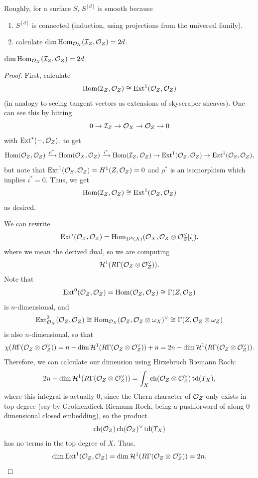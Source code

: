 \documentclass[12pt]{article}
\DeclareMathOperator{\chern}{ch}
\DeclareMathOperator{\todd}{td}
\begin{document}
Roughly, for a surface $S$, $S^{[d]}$ is smooth because
\begin{enumerate}
    \item $S^{[d]}$ is connected (induction, using projections from the universal family).
    \item calculate $\dim \mathrm{Hom}_{\mathcal{O}_X}(\mathcal{I}_Z,\mathcal{O}_Z) = 2d$. 
\end{enumerate}

\begin{prop}
    $\dim \mathrm{Hom}_{\mathcal{O}_X}(\mathcal{I}_Z,\mathcal{O}_Z) = 2d$.
\end{prop}
\begin{proof}
    First, calculate
    \[\mathrm{Hom}(\mathcal{I}_Z,\mathcal{O}_Z) \cong \mathrm{Ext}^1(\mathcal{O}_Z,\mathcal{O}_Z)\]
    (in analogy to seeing tangent vectors as extensions of skyscraper sheaves). One can see this by hitting
    \[0\to \mathcal{I}_Z \to \mathcal{O}_X \to \mathcal{O}_Z \to 0\]
    with $\mathrm{Ext}^*(-,\mathcal{O}_Z)$, to get
    \[\mathrm{Hom}(\mathcal{O}_Z,\mathcal{O}_Z) \xrightarrow{\rho^*} \mathrm{Hom}(\mathcal{O}_X,\mathcal{O}_Z) \xrightarrow{i^*} \mathrm{Hom}(\mathcal{I}_Z,\mathcal{O}_Z) \to \mathrm{Ext}^1(\mathcal{O}_Z,\mathcal{O}_Z) \to \mathrm{Ext}^1(\mathcal{O}_S,\mathcal{O}_Z),\]
    but note that $\mathrm{Ext}^1(\mathcal{O}_S,\mathcal{O}_Z)=H^1(Z,\mathcal{O}_Z)=0$ and $\rho^*$ is an isomorphism which implies $i^*=0$. Thus, we get
    \[\mathrm{Hom}(\mathcal{I}_Z,\mathcal{O}_Z) \cong \mathrm{Ext}^1(\mathcal{O}_Z,\mathcal{O}_Z)\]
    as desired.

    We can rewrite
    \[\mathrm{Ext}^i(\mathcal{O}_Z,\mathcal{O}_Z) = \mathrm{Hom}_{D^b(X)}(\mathcal{O}_X,\mathcal{O}_Z\otimes\mathcal{O}_Z^\vee[i]),\]
    where we mean the derived dual, so we are computing
    \[\mathcal{H}^1(R\Gamma(\mathcal{O}_Z\otimes \mathcal{O}_Z^\vee)).\]
    Note that
    \[\mathrm{Ext}^0(\mathcal{O}_Z,\mathcal{O}_Z) = \mathrm{Hom}(\mathcal{O}_Z,\mathcal{O}_Z) \cong \Gamma(Z,\mathcal{O}_Z)\]
    is $n$-dimensional, and
    \[\mathrm{Ext}_{\mathcal{O}_X}^2(\mathcal{O}_Z,\mathcal{O}_Z) \cong \mathrm{Hom}_{\mathcal{O}_X}(\mathcal{O}_Z,\mathcal{O}_Z\otimes \omega_X)^\vee \cong \Gamma(Z,\mathcal{O}_Z\otimes \omega_Z)\]
    is also $n$-dimensional, so that
    \[\chi(R\Gamma(\mathcal{O}_Z\otimes \mathcal{O}_Z^\vee)) = n - \dim \mathcal{H}^1(R\Gamma(\mathcal{O}_Z\otimes \mathcal{O}_Z^\vee)) + n = 2n - \dim \mathcal{H}^1(R\Gamma(\mathcal{O}_Z\otimes \mathcal{O}_Z^\vee)).\]
    Therefore, we can calculate our dimension using Hirzebruch Riemann Roch:
    \[2n - \dim \cH^1(R\Gamma(\cO_Z\otimes \cO_Z^\vee)) = \int_X \chern(\cO_Z \otimes \cO_Z^\vee) \todd(T_X),\]
    where this integral is actually 0, since the Chern character of $\mathcal{O}_Z$ only exists in top degree (say by Grothendieck Riemann Roch, being a pushforward of along 0 dimensional closed embedding), so the product
    \[\chern(\cO_Z) \chern(\cO_Z)^\vee \todd(T_X)\]
    has no terms in the top degree of $X$. Thus,
    \[\dim \mathrm{Ext}^1(\mathcal{O}_Z,\mathcal{O}_Z) = \dim \mathcal{H}^1(R\Gamma(\mathcal{O}_Z\otimes \mathcal{O}_Z^\vee)) = 2n.\]
\end{proof}
\end{document}
